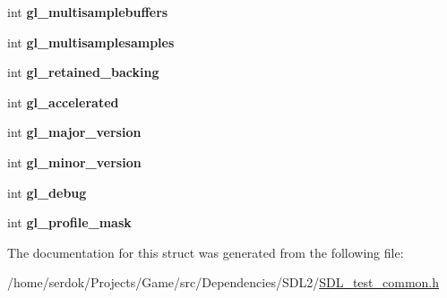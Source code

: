 \begin{DoxyCompactItemize}
\item 
\mbox{\label{structSDLTest__CommonState_a083f7381809b23f0ac3a9a8de562f70c}} 
int {\bfseries gl\+\_\+multisamplebuffers}
\item 
\mbox{\label{structSDLTest__CommonState_a96718b47862d4962e4a7ae9a62ce4a30}} 
int {\bfseries gl\+\_\+multisamplesamples}
\item 
\mbox{\label{structSDLTest__CommonState_a5fa59e7aa6210fcde02940536eea9c12}} 
int {\bfseries gl\+\_\+retained\+\_\+backing}
\item 
\mbox{\label{structSDLTest__CommonState_a2dca523be403a9ff6fe2dd7b1808baba}} 
int {\bfseries gl\+\_\+accelerated}
\item 
\mbox{\label{structSDLTest__CommonState_a766e471516e0a39d0bb8c14ea2042bdf}} 
int {\bfseries gl\+\_\+major\+\_\+version}
\item 
\mbox{\label{structSDLTest__CommonState_a5a50c65004454c791da21a3473388608}} 
int {\bfseries gl\+\_\+minor\+\_\+version}
\item 
\mbox{\label{structSDLTest__CommonState_a2710657ef2a0c8aabebc5fceb01c71b5}} 
int {\bfseries gl\+\_\+debug}
\item 
\mbox{\label{structSDLTest__CommonState_aa923ff5f227c35523a4e491863a7d907}} 
int {\bfseries gl\+\_\+profile\+\_\+mask}
\end{DoxyCompactItemize}


The documentation for this struct was generated from the following file\+:\begin{DoxyCompactItemize}
\item 
/home/serdok/\+Projects/\+Game/src/\+Dependencies/\+S\+D\+L2/\hyperlink{SDL__test__common_8h}{S\+D\+L\+\_\+test\+\_\+common.\+h}\end{DoxyCompactItemize}
